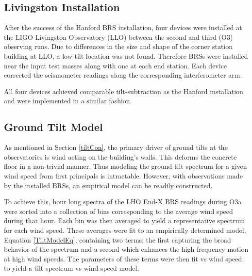 \documentclass [12pt, proquest]{uwthesis}[2019]
\begin{document}
\subsection{Livingston Installation}

\quad After the success of the Hanford BRS installation, four devices were installed at the LIGO Livingston Observatory (LLO) between the second and third (O3) observing runs. Due to differences in the size and shape of the corner station building at LLO, a low tilt location was not found. Therefore BRSs were installed near the input test masses along with one at each end station. Each device corrected the seismometer readings along the corresponding interferometer arm. 

All four devices achieved comparable tilt-subtraction as the Hanford installation and were implemented in a similar fashion. 

\subsection{Ground Tilt Model}


As mentioned in Section \ref{tiltCon}, the primary driver of ground tilts at the observatories is wind acting on the building's walls. This deforms the concrete floor in a non-trivial manner. Thus modeling the ground tilt spectrum for a given wind speed from first principals is intractable. However, with observations made by the installed BRSs, an empirical model can be readily constructed.

To achieve this, hour long spectra of the LHO End-X BRS readings during O3a were sorted into a collection of bins corresponding to the average wind speed during that hour. Each bin was then averaged to yield a representative spectrum for each wind speed. These averages were fit to an empirically determined model, Equation \ref{TiltModelEq}, containing two terms: the first capturing the broad behavior of the spectrum and a second which enhances the high frequency motion at high wind speeds. The parameters of these terms were then fit vs wind speed to yield a tilt spectrum vs wind speed model. 
\end{document}
